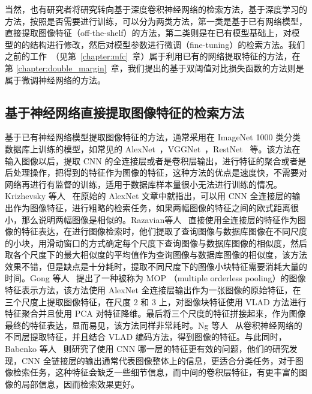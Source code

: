 当然，也有研究者将研究转向基于深度卷积神经网络的检索方法，基于深度学习的方法，按照是否需要进行训练，可以分为两类方法，第一类是基于已有网络模型，直接提取图像特征（off-the-shelf）的方法，第二类则是在已有模型基础上，对模型的的结构进行修改，然后对模型参数进行微调（fine-tuning）的检索方法。我们之前的工作~\cite{Hao2017MFCAM}（见第~\ref{chapter:mfc}~章）属于利用已有的网络提取特征的方法，在第 \ref{chapter:double_margin}~章，我们提出的基于双阈值对比损失函数的方法则是属于微调神经网络的方法。

\subsection{基于神经网络直接提取图像特征的检索方法}

基于已有神经网络模型提取图像特征的方法，通常采用在 ImageNet 1000 类分类数据库上训练的模型，如常见的 AlexNet~\cite{Krizhevsky2012ImageNetCW}，VGGNet~\cite{Simonyan2014VeryDC}，RestNet~\cite{He2016DeepRL} 等。该方法在输入图像以后，提取 CNN 的全连接层或者是卷积层输出，进行特征的聚合或者是后处理操作，把得到的特征作为图像的特征，这种方法的优点是速度快，不需要对网络再进行有监督的训练，适用于数据库样本量很小无法进行训练的情况。Krizhevsky 等人~\cite{Krizhevsky2012ImageNetCW} 在原始的 AlexNet 文章中就指出，可以用 CNN 全连接层的输出作为图像特征，进行粗略的检索任务，如果两幅图像的特征之间的欧式距离很小，那么说明两幅图像是相似的。Razavian等人~\cite{Razavian2014CNNFO} 直接使用全连接层的特征作为图像的特征表达，在进行图像检索时，他们提取了查询图像与数据库图像在不同尺度的小块，用滑动窗口的方式确定每个尺度下查询图像与数据库图像的相似度，然后取各个尺度下的最大相似度的平均值作为查询图像与数据库图像的相似度，该方法效果不错，但是缺点是十分耗时，提取不同尺度下的图像小块特征需要消耗大量的时间。Gong 等人~\cite{Gong2014MultiscaleOP} 提出了一种被称为 MOP （multiple orderless pooling）的图像特征表示方法，该方法使用 AlexNet 全连接层输出作为一张图像的原始特征，在三个尺度上提取图像特征，在尺度 2 和 3 上，对图像块特征使用 VLAD 方法进行特征聚合并且使用 PCA 对特征降维。最后将三个尺度的特征拼接起来，作为图像最终的特征表达，显而易见，该方法同样非常耗时。Ng 等人~\cite{Ng2015ExploitingLF} 从卷积神经网络的不同层提取特征，并且结合 VLAD 编码方法，得到图像的特征。与此同时，Babenko 等人~\cite{Babenko2014NeuralCF} 则研究了使用 CNN 哪一层的特征更有效的问题，他们的研究发现，CNN 全链接层的输出通常代表图像整体上的信息，更适合分类任务，对于图像检索任务，这种特征会缺乏一些细节信息，而中间的卷积层特征，有更丰富的图像的局部信息，因而检索效果更好。

